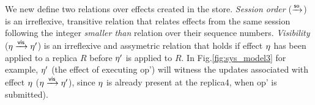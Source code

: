 We new define two relations over effects created in the store.
\emph{Session order} ($\xrightarrow{{\normalfont \textsf{so}}}$) is an irreflexive, transitive relation that relates
effects from the same session following the integer \emph{smaller
than} relation over their sequence numbers.  \emph{Visibility} ($\eta
\xrightarrow{{\normalfont \textsf{vis}}} \eta'$) is an
irreflexive and assymetric relation that holds if effect $\eta$ has
been applied to a replica $R$ before $\eta'$ is applied to $R$.  In
Fig.\ref{fig:sys_model3} for example, $\eta'$ (the effect of executing
op') will witness the updates associated with effect $\eta$
($\eta \xrightarrow{{\normalfont \textsf{vis}}} \eta'$), since $\eta$ is already present at
the replica4, when op' is submitted).





















\newpage































































